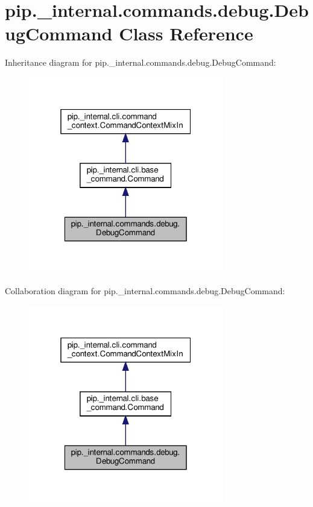 \hypertarget{classpip_1_1__internal_1_1commands_1_1debug_1_1DebugCommand}{}\section{pip.\+\_\+internal.\+commands.\+debug.\+Debug\+Command Class Reference}
\label{classpip_1_1__internal_1_1commands_1_1debug_1_1DebugCommand}


Inheritance diagram for pip.\+\_\+internal.\+commands.\+debug.\+Debug\+Command\+:
\nopagebreak
\begin{figure}[H]
\begin{center}
\leavevmode
\includegraphics[width=241pt]{classpip_1_1__internal_1_1commands_1_1debug_1_1DebugCommand__inherit__graph}
\end{center}
\end{figure}


Collaboration diagram for pip.\+\_\+internal.\+commands.\+debug.\+Debug\+Command\+:
\nopagebreak
\begin{figure}[H]
\begin{center}
\leavevmode
\includegraphics[width=241pt]{classpip_1_1__internal_1_1commands_1_1debug_1_1DebugCommand__coll__graph}
\end{center}
\end{figure}
